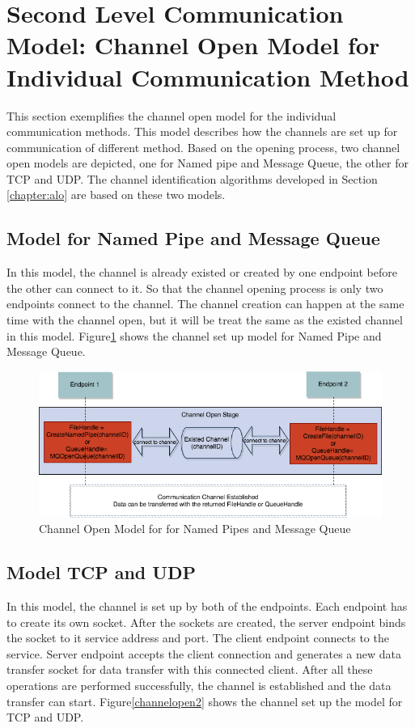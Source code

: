 \section{Second Level Communication Model: Channel Open Model for Individual Communication Method}    
This section exemplifies the channel open model for the individual communication methods. This model describes how the channels are set up for communication of different method. Based on the opening process, two channel open models are depicted, one for Named pipe and Message Queue, the other for TCP and UDP. The channel identification algorithms developed in Section \ref{chapter:alo} are based on these two models.
\subsection{Model for Named Pipe and Message Queue}
In this model, the channel is already existed or created by one endpoint before the other can connect to it. So that the channel opening process is only two endpoints connect to the channel. The channel creation can happen at the same time with the channel open, but it will be treat the same as the existed channel in this model. Figure\ref{channelopen1} shows the channel set up model for Named Pipe and Message Queue.

\begin{figure}[H]
\centerline{\includegraphics[scale=0.55]{Figures/channelopen1}}
 \caption{Channel Open Model for  for Named Pipes and Message Queue}
\label{channelopen1}
\end{figure}

\subsection{Model TCP and UDP}
In this model, the channel is set up by both of the endpoints. Each endpoint has to create its
own socket. After the sockets are created, the server endpoint binds the socket to it service address and port. The client endpoint connects to the service. Server endpoint accepts the client connection and generates a new data transfer socket for data transfer with this connected client. After all these operations are performed successfully, the channel is established and the data transfer can start. Figure\ref{channelopen2} shows the channel set up the model for TCP and UDP.

